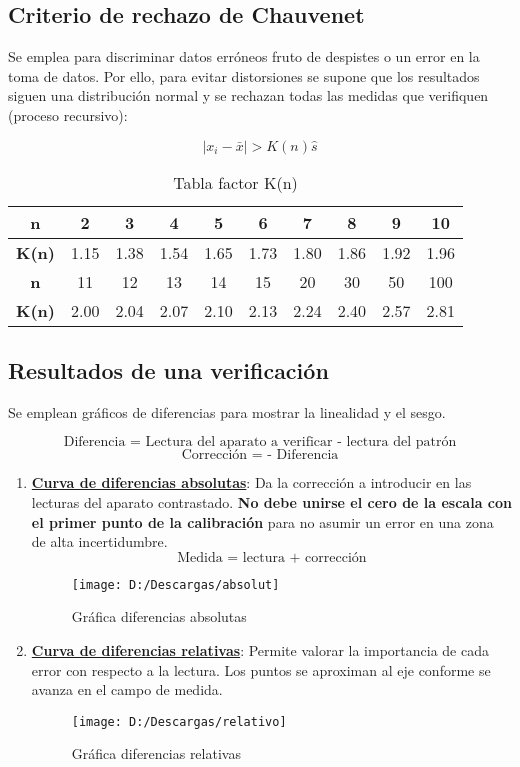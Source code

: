 \subsection{Criterio de rechazo de Chauvenet}
Se emplea para discriminar datos erróneos fruto de despistes o un error en la toma de datos. Por ello, para evitar distorsiones se supone que los resultados siguen una distribución normal y se rechazan todas las medidas que verifiquen (proceso recursivo):

\[\lvert x_i - \bar x  \rvert> K(n) \hat{s}\]

\renewcommand{\arraystretch}{1.1} %
\begin{table}[H]
	\centering
	\begin{tabular}{|c|c|c|c|c|c|c|c|c|c|}
		\hline
		\textbf{n} &  2 & 3& 4& 5& 6& 7& 8& 9& 10 \\
		\hline
		\textbf{K(n)} &  1.15 & 1.38& 1.54& 1.65& 1.73& 1.80& 1.86& 1.92&1.96\\
		\hline
		\textbf{n} &11& 12& 13& 14& 15& 20& 30& 50& 100\\
		\hline
		
		\textbf{K(n)} & 2.00& 2.04& 2.07& 2.10& 2.13& 2.24& 2.40& 2.57& 2.81\\
		\hline
	\end{tabular}
	\caption{Tabla factor K(n)}
	\label{tab:example}
\end{table}

\subsection{Resultados de una verificación}
Se emplean gráficos de diferencias para mostrar la linealidad y el sesgo.

\[\text{Diferencia = Lectura del aparato a verificar - lectura del patrón}\]
\[\text{Corrección = - Diferencia}\]
\begin{enumerate}
	\item \underline{\textbf{Curva de diferencias absolutas}}: Da la corrección a introducir en las lecturas del aparato contrastado. \textbf{No debe unirse el cero de la escala con el primer punto de la calibración} para no asumir un error en una zona de alta incertidumbre.
	\[\text{Medida = lectura + corrección}\]
\begin{figure}[H]
	\centering
	\texttt{[image: D:/Descargas/absolut]}
	\caption{Gráfica diferencias absolutas}
	\label{fig:absolut}
\end{figure}
	
	
	\item  \underline{\textbf{Curva de diferencias relativas}}: Permite valorar la importancia de cada error con respecto a la lectura. Los puntos se aproximan al eje conforme se avanza en el campo de medida.


\begin{figure}[H]
	\centering
	\texttt{[image: D:/Descargas/relativo]}
	\caption{Gráfica diferencias relativas}
	\label{fig:relativo}
\end{figure}





\end{enumerate}
